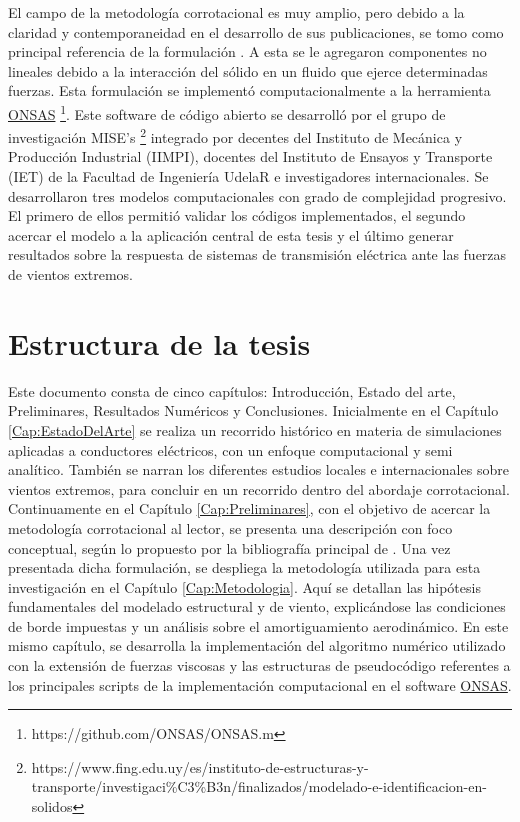 El campo de la metodología corrotacional es muy amplio, pero debido a la claridad y contemporaneidad en el desarrollo de sus publicaciones, se tomo como principal referencia de la formulación \citep{Le2014}. A esta se le agregaron componentes no lineales debido a la interacción del sólido en un fluido que ejerce determinadas fuerzas. Esta formulación se implementó computacionalmente a la herramienta \href{https://github.com/ONSAS/ONSAS.m}{ONSAS} \footnote{https://github.com/ONSAS/ONSAS.m}. Este software de código abierto se desarrolló por el grupo de investigación MISE's \footnote{https://www.fing.edu.uy/es/instituto-de-estructuras-y-transporte/investigaci\%C3\%B3n/finalizados/modelado-e-identificacion-en-solidos} integrado por decentes del Instituto de Mecánica y Producción Industrial (IIMPI), docentes del Instituto de Ensayos y Transporte (IET)  de la Facultad de Ingeniería UdelaR e investigadores internacionales. Se desarrollaron tres modelos computacionales con grado de complejidad progresivo. El primero de ellos permitió validar los códigos implementados, el segundo acercar el modelo a la aplicación central de esta tesis y el último generar resultados sobre la respuesta de sistemas de transmisión eléctrica ante las fuerzas de vientos extremos.


\section{Estructura de la tesis}

Este documento consta de cinco capítulos: Introducción, Estado del arte, Preliminares, Resultados Numéricos y Conclusiones. Inicialmente en el Capítulo \ref{Cap:EstadoDelArte} se realiza un recorrido histórico en materia de simulaciones aplicadas a conductores eléctricos, con un enfoque computacional y semi analítico. También se narran los diferentes estudios locales e internacionales sobre vientos extremos, para concluir en un recorrido dentro del abordaje corrotacional. Continuamente en el Capítulo \ref{Cap:Preliminares}, con el objetivo de acercar la metodología corrotacional al lector, se presenta una descripción con foco conceptual, según lo propuesto por la bibliografía principal de \citet{Le2014}. Una vez presentada dicha formulación, se despliega la metodología utilizada para esta investigación en el Capítulo \ref{Cap:Metodologia}. Aquí se detallan las hipótesis fundamentales del modelado estructural y de viento, explicándose las condiciones de borde impuestas y un análisis sobre el amortiguamiento aerodinámico. En este mismo capítulo, se desarrolla la implementación del algoritmo numérico utilizado con la extensión de fuerzas viscosas y las estructuras de pseudocódigo referentes a los principales scripts de la implementación computacional en el software \href{https://github.com/ONSAS/ONSAS/}{ONSAS}. 


